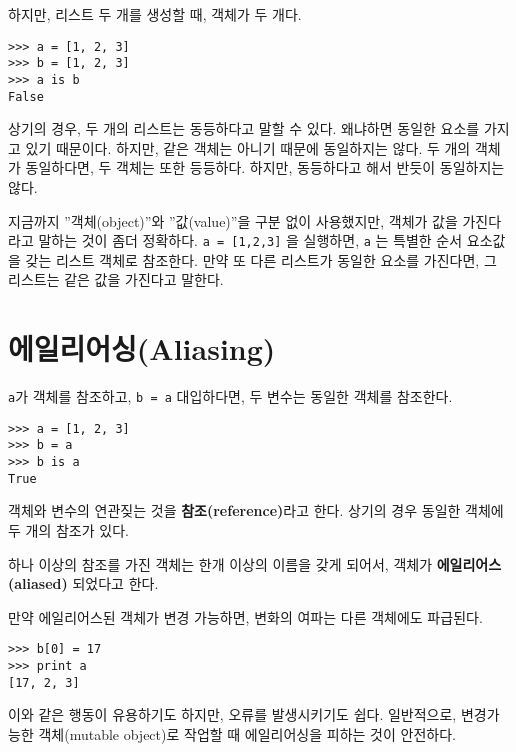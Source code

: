 하지만, 리스트 두 개를 생성할 때, 객체가 두 개다.

\beforeverb
\begin{verbatim}
>>> a = [1, 2, 3]
>>> b = [1, 2, 3]
>>> a is b
False
\end{verbatim}
\afterverb
%

상기의 경우, 두 개의 리스트는 동등하다고 말할 수 있다. 
왜냐하면 동일한 요소를 가지고 있기 때문이다.
하지만, 같은 객체는 아니기 때문에 동일하지는 않다. 
두 개의 객체가 동일하다면, 두 객체는 또한 등등하다.
하지만, 동등하다고 해서 반듯이 동일하지는 않다.


지금까지 ''객체(object)''와 ''값(value)''을 구분 없이 사용했지만, 객체가 값을 가진다라고 말하는 것이 좀더 정확하다.
{\tt a = [1,2,3]} 을 실행하면, {\tt a} 는 특별한 순서 요소값을 갖는 리스트 객체로 참조한다. 
만약 또 다른 리스트가 동일한 요소를 가진다면, 그 리스트는 같은 값을 가진다고 말한다.


\section{에일리어싱(Aliasing)}


{\tt a}가 객체를 참조하고, {\tt b = a}  대입하다면, 두 변수는 동일한 객체를 참조한다.

\beforeverb
\begin{verbatim}
>>> a = [1, 2, 3]
>>> b = a
>>> b is a
True
\end{verbatim}
\afterverb
%

객체와 변수의 연관짖는 것을 {\bf 참조(reference)}라고 한다. 
상기의 경우 동일한 객체에 두 개의 참조가 있다.


하나 이상의 참조를 가진 객체는 한개 이상의 이름을 갖게 되어서, 객체가 {\bf 에일리어스(aliased)} 되었다고 한다.


만약 에일리어스된 객체가 변경 가능하면, 변화의 여파는 다른 객체에도 파급된다.

\beforeverb
\begin{verbatim}
>>> b[0] = 17
>>> print a
[17, 2, 3]
\end{verbatim}
\afterverb
%

이와 같은 행동이 유용하기도 하지만, 오류를 발생시키기도 쉽다. 
일반적으로, 변경가능한 객체(mutable object)로 작업할 때 에일리어싱을 피하는 것이 안전하다.

